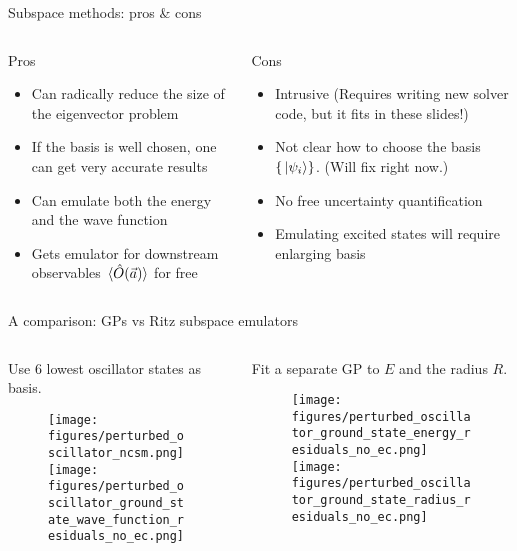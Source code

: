 \documentclass[xcolor=dvipsnames, aspectratio=169]{beamer}
\begin{document}
\begin{frame}{Subspace methods: pros \& cons}

\begin{columns}[t]
\begin{column}{0.5\textwidth}
\begin{myblock}[valign=center]{Pros}
\setlength\leftmargini{0pt}
\begin{itemize}
\item Can radically reduce the size of the eigenvector problem
\item If the basis is well chosen, one can get very accurate results
\item Can emulate both the energy and the wave function
\item Gets emulator for downstream observables $\ev*{\hat O(\lecs)}$ for free
\end{itemize}
\end{myblock}
\end{column}
\begin{column}{0.5\textwidth}
\begin{myblock}[valign=center]{Cons}
\setlength\leftmargini{0pt}
\begin{itemize}
\item Intrusive (Requires writing \alert{new} solver code, but it fits in these slides!)
\item Not clear how to choose the basis $\{\ket*{\psi_i}\}$. (\alert{Will fix right now.})
\item No free uncertainty quantification
\item Emulating excited states will require enlarging basis
\end{itemize}
\end{myblock}
\end{column}
\end{columns}
\end{frame}


\begin{frame}{A comparison: GPs vs Ritz subspace emulators}
\begin{columns}[t]
\begin{column}{0.5\textwidth}
Use 6 lowest oscillator states as basis.
\begin{figure}
\texttt{[image: figures/perturbed\_oscillator\_ncsm.png]}
\texttt{[image: figures/perturbed\_oscillator\_ground\_state\_wave\_function\_residuals\_no\_ec.png]}
\end{figure}
\end{column}
\begin{column}{0.5\textwidth}
Fit a separate GP to $E$ and the radius $R$.
\begin{figure}
\texttt{[image: figures/perturbed\_oscillator\_ground\_state\_energy\_residuals\_no\_ec.png]}
\texttt{[image: figures/perturbed\_oscillator\_ground\_state\_radius\_residuals\_no\_ec.png]}
\end{figure}
\end{column}
\end{columns}
\end{frame}
\end{document}
